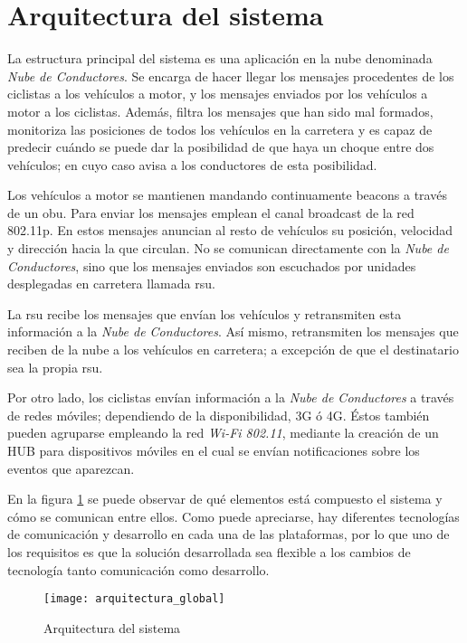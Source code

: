 \section{Arquitectura del sistema}\label{section:arquitecturaSistema}
La estructura principal del sistema es una aplicación en la nube denominada
\emph{Nube de Conductores}. Se encarga de hacer llegar los mensajes procedentes
de los ciclistas a los vehículos a motor, y los mensajes enviados por los vehículos
a motor a los ciclistas. Además, filtra los mensajes que han sido mal formados,
monitoriza las posiciones de todos los vehículos en la carretera y es capaz de
predecir cuándo se puede dar la posibilidad de que haya un choque entre dos vehículos;
en cuyo caso avisa a los conductores de esta posibilidad.

Los vehículos a motor se mantienen mandando continuamente beacons a través de un
\gls{obu}. Para enviar los mensajes emplean el canal broadcast de la red 802.11p.
En estos mensajes anuncian al resto de vehículos su posición, velocidad y dirección
hacia la que circulan. No se comunican directamente con la \emph{Nube de Conductores},
sino que los mensajes enviados son escuchados por unidades desplegadas en carretera
llamada \gls{rsu}.

La \gls{rsu} recibe los mensajes que envían los vehículos y retransmiten esta
información a la \emph{Nube de Conductores}. Así mismo, retransmiten los mensajes
que reciben de la nube a los vehículos en carretera; a excepción de que el
destinatario sea la propia \gls{rsu}.

Por otro lado, los ciclistas envían información a la \emph{Nube de Conductores} a
través de redes móviles; dependiendo de la disponibilidad, 3G ó 4G. Éstos también
pueden agruparse empleando la red \emph{Wi-Fi 802.11}, mediante la creación de un
HUB para dispositivos móviles en el cual se envían notificaciones sobre los eventos
que aparezcan.

En la figura \ref{fig:ArquitecturaSistema} se puede observar de qué elementos está
compuesto el sistema y cómo se comunican entre ellos. Como puede apreciarse, hay
diferentes tecnologías de comunicación y desarrollo en cada una de las plataformas,
por lo que uno de los requisitos es que la solución desarrollada sea flexible a los
cambios de tecnología tanto comunicación como desarrollo.

\begin{figure}[H]
	\begin{center}
		\texttt{[image: arquitectura\_global]}
		\caption{Arquitectura del sistema}
		\label{fig:ArquitecturaSistema}
	 \end{center}
\end{figure}

